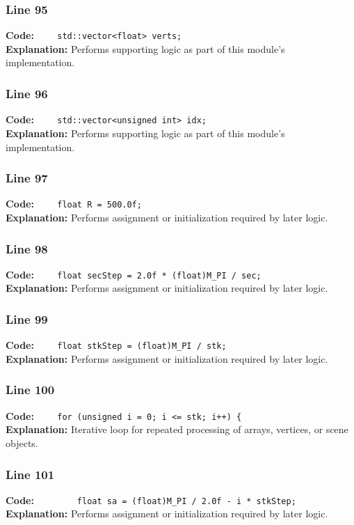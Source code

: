 \documentclass[11pt,a4paper]{article}
\begin{document}
\subsubsection*{Line 95}
\textbf{Code:} \verb|    std::vector<float> verts;|\\
\textbf{Explanation:} Performs supporting logic as part of this module's implementation.

\subsubsection*{Line 96}
\textbf{Code:} \verb|    std::vector<unsigned int> idx;|\\
\textbf{Explanation:} Performs supporting logic as part of this module's implementation.

\subsubsection*{Line 97}
\textbf{Code:} \verb|    float R = 500.0f;|\\
\textbf{Explanation:} Performs assignment or initialization required by later logic.

\subsubsection*{Line 98}
\textbf{Code:} \verb|    float secStep = 2.0f * (float)M_PI / sec;|\\
\textbf{Explanation:} Performs assignment or initialization required by later logic.

\subsubsection*{Line 99}
\textbf{Code:} \verb|    float stkStep = (float)M_PI / stk;|\\
\textbf{Explanation:} Performs assignment or initialization required by later logic.

\subsubsection*{Line 100}
\textbf{Code:} \verb|    for (unsigned i = 0; i <= stk; i++) {|\\
\textbf{Explanation:} Iterative loop for repeated processing of arrays, vertices, or scene objects.

\subsubsection*{Line 101}
\textbf{Code:} \verb|        float sa = (float)M_PI / 2.0f - i * stkStep;|\\
\textbf{Explanation:} Performs assignment or initialization required by later logic.
\end{document}
